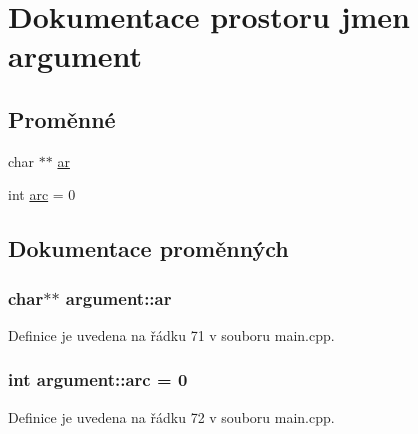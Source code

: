 \hypertarget{namespaceargument}{
\section{Dokumentace prostoru jmen argument}
\label{namespaceargument}
}
\subsection*{Proměnné}
\begin{DoxyCompactItemize}
\item 
char $\ast$$\ast$ \hyperlink{namespaceargument_aded18d94674556dc67cde6f133e91b8f}{ar}
\item 
int \hyperlink{namespaceargument_a45e1ebfb611bea112e44ab378ab3fd1d}{arc} = 0
\end{DoxyCompactItemize}


\subsection{Dokumentace proměnných}
\hypertarget{namespaceargument_aded18d94674556dc67cde6f133e91b8f}{
\subsubsection[{ar}]{\setlength{\rightskip}{0pt plus 5cm}char$\ast$$\ast$ {\bf argument::ar}}}
\label{namespaceargument_aded18d94674556dc67cde6f133e91b8f}


Definice je uvedena na řádku 71 v souboru main.cpp.

\hypertarget{namespaceargument_a45e1ebfb611bea112e44ab378ab3fd1d}{
\subsubsection[{arc}]{\setlength{\rightskip}{0pt plus 5cm}int {\bf argument::arc} = 0}}
\label{namespaceargument_a45e1ebfb611bea112e44ab378ab3fd1d}


Definice je uvedena na řádku 72 v souboru main.cpp.

